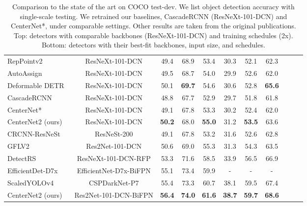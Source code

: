 \documentclass{article}
\newcommand{\name}{CenterNet2 }
\begin{document}
\begin{table*}[t]
\begin{tabular}{@{}l@{\ \ \ \ }c@{\ \ \ \ }c@{\ \ \ \ }c@{\ \ \ \ }c@{\ \ \ \ }c@{\ \ \ \ }c@{\ \ \ \ }c@{\ \ \ \ }c@{\ \ \ \ }c@{\ \ \ \ }c@{}}
        RepPointv2~\cite{yang2019reppoints} & ResNeXt-101-DCN & 49.4 & 68.9 & 53.4 & 30.3 & 52.1 & 62.3 \\
        AutoAssign~\cite{zhu2020autoassign} & ResNeXt-101-DCN & 49.5 & 68.7 & 54.0 & 29.9 & 52.6 & 62.0 \\
        Deformable DETR~\cite{zhu2020deformable} & ResNeXt-101-DCN & 50.1 & \textbf{69.7} & 54.6 & 30.6 & 52.8 & \textbf{65.6} \\
        CascadeRCNN~\cite{cai2018cascade} & ResNeXt-101-DCN & 48.8 & 67.7 & 52.9 & 29.7 & 51.8 & 61.8 \\
        CenterNet* & ResNeXt-101-DCN & 49.1 & 67.8 & 53.3 & 30.2 & 52.4 & 62.0\\
        \name (ours) & ResNeXt-101-DCN & \textbf{50.2} & 68.0 & \textbf{55.0} & 31.2 & \textbf{53.5} & 63.6\\
        \midrule
        CRCNN-ResNeSt~\cite{zhang2020resnest} & ResNeSt-200 & 49.1 & 67.8 & 53.2 & 31.6 & 52.6 & 62.8 \\
        GFLV2~\cite{li2020generalizedv2} & Res2Net-101-DCN & 50.6 & 69.0 & 55.3 & 31.3 & 54.3 & 63.5 \\
        DetectRS~\cite{qiao2020detectors} & ResNeXt-101-DCN-RFP & 53.3 & 71.6 & 58.5 & 33.9 & 56.5 & 66.9 \\
        EfficientDet-D7x~\cite{tan2020efficientdet} & EfficientNet-D7x-BiFPN & 55.1 & {73.4} & 59.9 & - & - & - \\
        ScaledYOLOv4~\cite{wang2020scaled} & CSPDarkNet-P7 & 55.4 & { 73.3} & 60.7 & {38.1} & {59.5} & 67.4 \\
        CenterNet2 (ours) & Res2Net-101-DCN-BiFPN & {\bf 56.4} & {\bf 74.0} & {\bf 61.6} & {\bf 38.7} & {\bf 59.7} & {\bf 68.6} \\
\bottomrule
\end{tabular}
\normalsize
\vspace{-2mm}
\caption{Comparison to the state of the art on COCO test-dev. We list object detection accuracy with single-scale testing. We retrained our baselines, CascadeRCNN (ResNeXt-101-DCN) and CenterNet*, under comparable settings. Other results are taken from the original publications. Top: detectors with comparable backbones (ResNeXt-101-DCN) and training schedules (2x). Bottom: detectors with their best-fit backbones, input size, and schedules.}
\label{table:sota}
\vspace{-5mm}
\end{table*}
\end{document}
